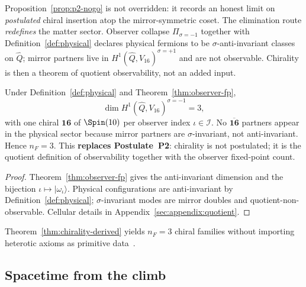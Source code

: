 \begin{remark}
Proposition~\ref{prop:p2-nogo} is not overridden: it records an honest limit
on \emph{postulated} chiral insertion atop the mirror-symmetric coset. The
elimination route \emph{redefines} the matter sector. Observer collapse
$\Pi_{\sigma=-1}$ together with Definition~\ref{def:physical} declares
physical fermions to be $\sigma$-anti-invariant classes on $\hat Q$; mirror
partners live in $H^1(\hat Q,V_{16})^{\sigma=+1}$ and are not observable.
Chirality is then a theorem of quotient observability, not an added input.
\end{remark}

\begin{theorem}\label{thm:chirality-derived}
Under Definition~\ref{def:physical} and Theorem~\ref{thm:observer-fp},
\begin{equation}\label{eq:chirality-derived}
  \dim H^1(\hat Q,V_{16})^{\sigma=-1}=3,
\end{equation}
with one chiral $\mathbf{16}$ of $\Spin(10)$ per observer index
$\iota\in\mathcal{I}$. No $\overline{\mathbf{16}}$ partners appear in the
physical sector because mirror partners are $\sigma$-invariant, not
anti-invariant. Hence $n_F=3$. This \textbf{replaces Postulate~P2}: chirality
is not postulated; it is the quotient definition of observability together
with the observer fixed-point count.
\end{theorem}

\begin{proof}
Theorem~\ref{thm:observer-fp} gives the anti-invariant dimension and the
bijection $\iota\mapsto|\omega_\iota\rangle$. Physical configurations are
anti-invariant by Definition~\ref{def:physical}; $\sigma$-invariant modes are
mirror doubles and quotient-non-observable. Cellular details in
Appendix~\ref{sec:appendix:quotient}.
\end{proof}

\begin{corollary}\label{thm:three-families}
Theorem~\ref{thm:chirality-derived} yields $n_F=3$ chiral families without
importing heterotic axioms as primitive data~\cite{Witten1985}.
\end{corollary}

\subsection{Spacetime from the climb}
\label{sec:physics:spacetime}

